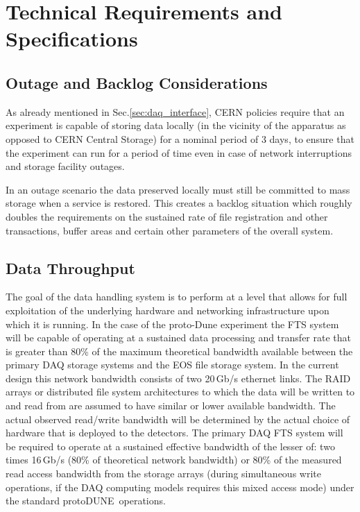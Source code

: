 \documentclass[pdftex,12pt,letter]{article}
\newcommand{\pd}{protoDUNE\ }
\begin{document}
\section{Technical Requirements and Specifications}

\subsection{Outage and Backlog Considerations}
\label{sec:backlog}
As already mentioned in Sec.\ref{sec:daq_interface},
CERN policies require that an experiment is capable of storing data locally (in the vicinity of the apparatus as opposed to CERN Central
Storage)  for a nominal period of 3 days, to ensure that the experiment can run for a period of time even in case of network interruptions
and storage facility outages.

In an outage scenario the data preserved locally must still be committed to mass storage when a service is restored.
This creates a backlog situation which roughly doubles the requirements on the sustained rate of file registration and other transactions, buffer
areas and certain other parameters of the overall system.


\subsection{Data Throughput}

The goal of the data handling system is to perform at a level that allows for full exploitation of the underlying hardware and networking infrastructure
upon which  it is running.  In the case of the proto-Dune experiment the FTS system will be capable of operating at a sustained data processing and transfer
rate that is greater than 80\% of the maximum theoretical bandwidth available between the primary DAQ storage systems and the EOS file storage system.
 In the current design this network bandwidth consists of two 20\,Gb/s ethernet links.  The RAID arrays or distributed file system architectures to which the
data will be written to and read from are assumed to have similar or lower available bandwidth.  The actual observed read/write bandwidth will be determined
by the actual choice of hardware that is deployed to the detectors.  The primary DAQ FTS system will be required to operate at a sustained effective bandwidth
of the lesser of: two times 16\,Gb/s (80\% of theoretical network bandwidth) or 80\% of the measured read access bandwidth from the storage arrays
(during simultaneous write operations, if the DAQ computing models requires this mixed access mode) under the standard \pd operations.
\end{document}
